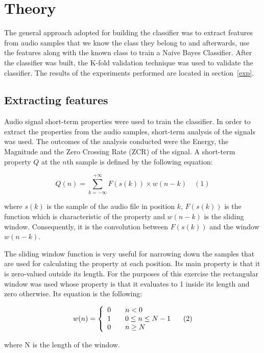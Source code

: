 \documentclass{article}
\begin{document}
\section{Theory}
\label{the}

The general approach adopted for building the classifier was to extract features from audio samples that we know the class they belong to and afterwards, use the features along with the known class to train a Naive Bayes Classifier.
After the classifier was built, the K-fold validation technique was used to validate the classifier.
The results of the experiments performed are located in section~\ref{exp}.

\subsection{Extracting features}

Audio signal short-term properties were used to train the classifier. 
In order to extract the properties from the audio samples, short-term analysis of the signals was used.
The outcomes of the analysis conducted were the Energy, the Magnitude and the Zero Crossing Rate (ZCR) of the signal.
A short-term property \(Q\) at the \(n\)th sample is defined by the following equation:

\[
  Q(n) = \sum_{k=-\infty}^{+\infty} F(s(k)) \times w(n-k) \quad (1)
\]

where \(s(k)\) is the sample of the audio file in position \(k\), \(F(s(k))\) is the function which is characteristic of the property and \(w(n-k)\) is the sliding window. 
Consequently, it is the convolution between \(F(s(k))\) and the window \(w(n-k)\).

The sliding window function is very useful for narrowing down the samples that are used for calculating the property at each position. 
Its main property is that it is zero-valued outside its length.
For the purposes of this exercise the rectangular window was used whose property is that it evaluates to 1 inside its length and zero otherwise.
Its equation is the following:

\[
  w(n) = \left\{ 
    \begin{array}{l l}
      0 & \quad n < 0 \\
      1 & \quad 0 \leq n \leq N-1 \\
      0 & \quad n \geq N
    \end{array} \right. \quad (2)
\]

where N is the length of the window.
\end{document}
